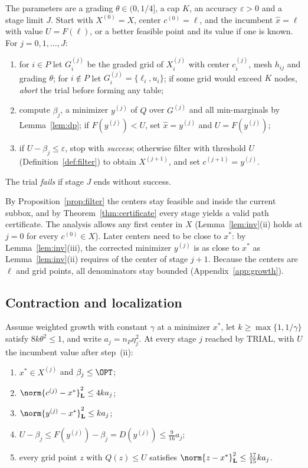 \begin{algorithm}\label{alg:trial}
The parameters are a grading $\theta\in(0,1/4]$, a cap $K$, an accuracy
$\varepsilon>0$ and a stage limit $J$. Start with $X^{(0)}=X$, center
$c^{(0)}=\ell$, and the incumbent $\hat x=\ell$ with value $U=F(\ell)$, or a
better feasible point and its value if one is known. For $j=0,1,\dots,J$:
\begin{enumerate}[label=(\roman*)]
\item for $i\in P$ let $G_i^{(j)}$ be the graded grid of $X_i^{(j)}$ with
center $c_i^{(j)}$, mesh $h_{ij}$ and grading $\theta$; for $i\notin P$ let
$G_i^{(j)}=\{\ell_i,u_i\}$; if some grid would exceed $K$ nodes,
\emph{abort} the trial before forming any table;
\item compute $\beta_j$, a minimizer $y^{(j)}$ of $Q$ over $G^{(j)}$ and all
min-marginals by Lemma~\ref{lem:dp}; if $F(y^{(j)})<U$, set
$\hat x=y^{(j)}$ and $U=F(y^{(j)})$;
\item if $U-\beta_j\le\varepsilon$, stop with \emph{success}; otherwise
filter with threshold $U$ (Definition~\ref{def:filter}) to obtain
$X^{(j+1)}$, and set $c^{(j+1)}=y^{(j)}$.
\end{enumerate}
The trial \emph{fails} if stage $J$ ends without success.
\end{algorithm}

By Proposition~\ref{prop:filter} the centers stay feasible and inside the
current subbox, and by Theorem~\ref{thm:certificate} every stage yields a
valid path certificate. The analysis allows any first center in $X$
(Lemma~\ref{lem:inv}(ii) holds at $j=0$ for every $c^{(0)}\in X$). Later
centers need to be close to $x^*$: by Lemma~\ref{lem:inv}(iii), the corrected
minimizer $y^{(j)}$ is as close to $x^*$ as Lemma~\ref{lem:inv}(ii) requires
of the center of stage $j+1$. Because the centers are $\ell$ and grid points,
all denominators stay bounded (Appendix~\ref{app:growth}).

\subsection{Contraction and localization}

\begin{lemma}\label{lem:inv}
Assume weighted growth with constant $\gamma$ at a minimizer $x^*$, let
$k\ge\max\{1,1/\gamma\}$ satisfy $8k\theta^2\le1$, and write
$a_j=n_P\eta_j^2$. At every stage $j$ reached by TRIAL, with $U$ the
incumbent value after step~(ii):
\begin{enumerate}[label=(\roman*)]
\item $x^*\in X^{(j)}$ and $\beta_j\le\OPT$;
\item $\norm{c^{(j)}-x^*}_{\mathbf L}^2\le4ka_j$;
\item $\norm{y^{(j)}-x^*}_{\mathbf L}^2\le ka_j$;
\item $U-\beta_j\le F(y^{(j)})-\beta_j=D(y^{(j)})\le\frac9{16}a_j$;
\item every grid point $z$ with $Q(z)\le U$ satisfies
$\norm{z-x^*}_{\mathbf L}^2\le\frac{17}{15}ka_j$.
\end{enumerate}
\end{lemma}

